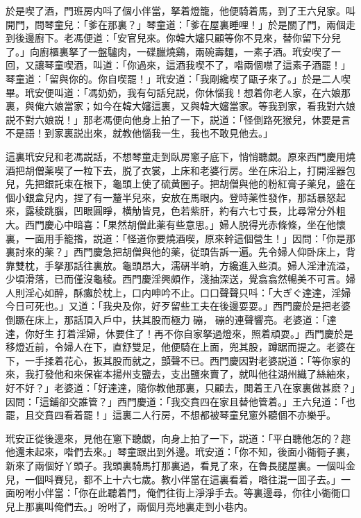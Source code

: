 於是喫了酒，門班房内呌了個小伴當，拏着燈籠，他便騎着馬，到了王六兒家。叫開門，問琴童兒：「爹在那裏？」琴童道：「爹在屋裏睡哩！」於是關了門，兩個走到後邊廚下。老馮便道：「安官兒來。你韓大嬸只顧等你不見來，替你留下分兒了。」向廚櫃裏拏了一盤驢肉，一碟臘燒鷄，兩碗壽麵，一素子酒。玳安喫了一回，又讓琴童喫酒，叫道：「你過來，這酒我喫不了，喒兩個噤了這素子酒罷！」琴童道：「留與你的。你自喫罷！」玳安道：「我剛纔喫了甌子來了。」於是二人喫畢。玳安便叫道：「馮奶奶，我有句話兒説，你休惱我！想着你老人家，在六娘那裏，與俺六娘當家；如今在韓大嬸這裏，又與韓大嬸當家。等我到家，看我對六娘説不對六娘説！」那老馮便向他身上拍了一下，説道：「怪倒路死猴兒，休要是言不是語！到家裏説出來，就教他惱我一生，我也不敢見他去。」

這裏玳安兒和老馮説話，不想琴童走到臥房窻子底下，悄悄聽覷。原來西門慶用燒酒把胡僧薬喫了一粒下去，脱了衣裳，上床和老婆行房。坐在床沿上，打開淫器包兒，先把銀託束在根下，龜頭上使了硫黄圈子。把胡僧與他的粉紅膏子薬兒，盛在個小銀盒兒内，捏了有一釐半兒來，安放在馬眼内。登時薬性發作，那話暴怒起來，露稜跳腦，凹眼圓睜，横觔皆見，色若紫肝，約有六七寸長，比尋常分外粗大。西門慶心中暗喜：「果然胡僧此薬有些意思。」婦人脱得光赤條條，坐在他懷裏，一面用手籠揝，説道：「怪道你要燒酒喫，原來幹這個營生！」因問：「你是那裏討來的薬？」西門慶急把胡僧與他的薬，従頭告訴一遍。先令婦人仰卧床上，背靠雙枕，手拏那話往裏放。龜頭昂大，濡硏半晌，方纔進入些湏。婦人淫津流溢，少頃滑落，已而僅沒龜稜。西門慶淫興頗作，淺抽深送，覺翕翕然暢美不可言。婦人則淫心如醉，酥癱於枕上，口内呻吟不止。口口聲聲只呌：「大ぎぐ達達，淫婦今日可死也。」又道：「我央及你，好歹留些工夫在後邊耍耍。」西門慶於是把老婆倒蹶在床上，那話頂入戶中，扶其股而極力𢵞磞，𢵞磞的連聲響亮。老婆道：「達達，你好生𢵞打着淫婦，休要住了！再不你自家拏過燈來，照着頑耍。」西門慶於是移燈近前，令婦人在下，直舒雙足，他便騎在上面，兜其股，蹲踞而提之。老婆在下，一手揉着花心，扳其股而就之，顫聲不已。西門慶因對老婆説道：「等你家的來，我打發他和來保崔本揚州支鹽去，支出鹽來賣了，就叫他往湖州織了絲紬來，好不好？」老婆道：「好達達，隨你教他那裏，只顧去，閒着王八在家裏做甚麽？」因問：「這鋪卻交誰管？」西門慶道：「我交賁四在家且替他管着。」王六兒道：「也罷，且交賁四看着罷！」這裏二人行房，不想都被琴童兒窻外聽個不亦樂乎。

玳安正從後邊來，見他在窻下聽覷，向身上拍了一下，説道：「平白聽他怎的？趂他還未起來，喒們去來。」琴童跟出到外邊。玳安道：「你不知，後面小衚衕子裏，新來了兩個好丫頭子。我頭裏騎馬打那裏過，看見了來，在魯長腿屋裏。一個叫金兒，一個呌賽兒，都不上十六七歲。教小伴當在這裏看着，喒往混一囬子去。」一面吩咐小伴當：「你在此聽着門，俺們往街上淨淨手去。等裏邊尋，你往小衚衕口兒上那裏叫俺們去。」吩咐了，兩個月亮地裏走到小巷内。

